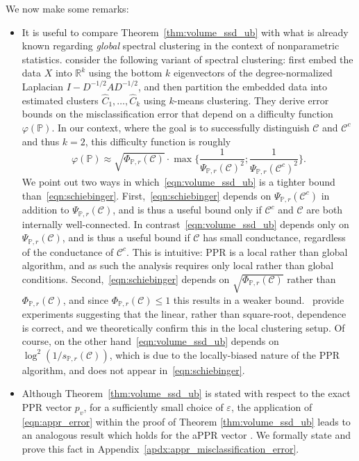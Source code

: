 \documentclass[11pt,twoside]{article}
\theoremstyle{definition}
\newcommand{\Reals}{\mathbb{R}}
\newcommand{\1}{\mathbf{1}}
\newcommand{\mc}[1]{\mathcal{#1}}
\newcommand{\Pbb}{\mathbb{P}}
\newcommand{\wh}[1]{\widehat{#1}}
\begin{document}
We now make some remarks:
\begin{itemize}
	\item It is useful to compare Theorem~\ref{thm:volume_ssd_ub} with what is already known regarding \emph{global} spectral clustering in the context of nonparametric statistics. \cite{schiebinger2015} consider the following variant of spectral clustering: first embed the data $X$ into $\Reals^{k}$ using the bottom $k$ eigenvectors of the degree-normalized Laplacian $I - D^{-1/2}AD^{-1/2}$, and then partition the embedded data into estimated clusters $\wh{C}_1,\ldots,\wh{C}_k$  using $k$-means clustering. They derive error bounds on the misclassification error that depend on a difficulty function $\varphi(\Pbb)$. In our context, where the goal is to successfully distinguish $\mc{C}$ and $\mc{C}^c$ and thus $k = 2$, this difficulty function is roughly
	\begin{equation}
	\label{eqn:schiebinger}
	\varphi(\Pbb) \approx \sqrt{\Phi_{\Pbb,r}(\mc{C})} \cdot \max\biggl\{ \frac{1}{\Psi_{\Pbb,r}(\mc{C})^2}; \frac{1}{\Psi_{\Pbb,r}(\mc{C}^c)^2}\biggr\}.
	\end{equation}
	We point out two ways in which~\eqref{eqn:volume_ssd_ub} is a tighter bound than~\eqref{eqn:schiebinger}. First,~\eqref{eqn:schiebinger} depends on $\Psi_{\Pbb,r}(\mc{C}^c)$ in addition to $\Psi_{\Pbb,r}(\mc{C})$, and is thus a useful bound only if $\mc{C}^c$ and $\mc{C}$ are both internally well-connected. In contrast~\eqref{eqn:volume_ssd_ub} depends only on $\Psi_{\Pbb,r}(\mc{C})$, and is thus a useful bound if $\mc{C}$ has small conductance, regardless of the conductance of $\mc{C}^c$. This is intuitive: PPR is a local rather than global algorithm, and as such the analysis requires only local rather than global conditions. Second,~\eqref{eqn:schiebinger} depends on $\sqrt{\Phi_{\Pbb,r}(\mc{C})}$ rather than $\Phi_{\Pbb,r}(\mc{C})$, and since $\Phi_{\Pbb,r}(\mc{C}) \leq 1$ this results in a weaker bound.~\citep{schiebinger2015} provide experiments suggesting that the linear, rather than square-root, dependence is correct, and we theoretically confirm this in the local clustering setup. Of course, on the other hand~\eqref{eqn:volume_ssd_ub} depends on $\log^2(1/s_{\Pbb,r}(\mc{C}))$, which is due to the locally-biased nature of the PPR algorithm, and does not appear in~\eqref{eqn:schiebinger}.
	
	\item Although Theorem~\ref{thm:volume_ssd_ub} is stated with respect to the exact PPR vector $p_v$, for a sufficiently small choice of $\varepsilon$, the 
	application of \eqref{eqn:appr_error} within the proof of Theorem
	\ref{thm:volume_ssd_ub} leads to an analogous result which holds for the aPPR vector . We formally state and prove this fact in Appendix~\ref{apdx:appr_misclassification_error}.
\end{itemize}
\end{document}
